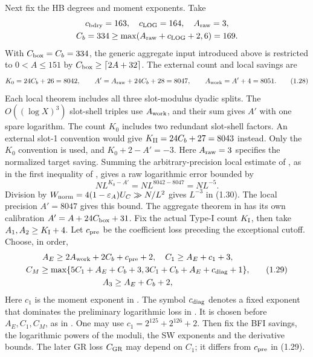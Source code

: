 Next fix the HB degrees and moment exponents.
Take
\[
 \begin{gathered}
 c_{\rm bdry}=163,\quad c_{\rm LOG}=164,\quad A_{\rm raw}=3,\\
 C_b=334\ge\max(A_{\rm raw}+c_{\rm LOG}+2,6)=169.
 \end{gathered}
\]
With $C_{\rm box}=C_b=334$, the generic aggregate input introduced above
is restricted to $0<A\le151$ by $C_{\rm box}\ge\lceil2A+32\rceil$.
The external count and local savings are
\begingroup\small
\[
 K_0=24C_b+26=8042,\qquad
 A'=A_{\rm raw}+24C_b+28=8047,\qquad
 A_{\rm work}=A'+4=8051.                                    \tag{1.28}
\]
\endgroup
Each local theorem includes all three slot-modulus dyadic splits.
The $O((\log X)^3)$ slot-shell triples use $A_{\rm work}$,
and their sum gives $A'$ with one spare logarithm.
The count $K_0$ includes two redundant slot-shell factors.
An external slot-1 convention would give
$K_{\rm II}=24C_b+27=8043$ instead.
Only the $K_0$ convention is used, and $K_0+2-A'=-3$.
Here $A_{\rm raw}=3$ specifies the normalized target saving.
Summing the arbitrary-precision local estimate of
\cite[Theorem~3.2, (3.13)]{Z1}, as in the first inequality of
\cite[(3.92)]{Z1}, gives a raw logarithmic error bounded by
\[
 N L^{K_0-A'}=N L^{8042-8047}=N L^{-5}.
\]
Division by $W_{\rm norm}=4(1-\varepsilon_A)U_C\gg N/L^2$
gives $L^{-3}$ in (1.30).
The local precision $A'=8047$ gives this bound.
The aggregate theorem in \cite{Z1} has its own calibration
$A'=A+24C_{\rm box}+31$.
Fix the actual Type-I count $K_{\rm I}$, then take $A_1,A_2\ge K_{\rm I}+4$.
Let $c_{\rm pre}$ be the coefficient loss preceding the exceptional cutoff.
Choose, in order,
\[
 \begin{gathered}
 A_E\ge2A_{\rm work}+2C_b+c_{\rm pre}+2,\quad C_1\ge A_E+c_1+3,\\
 C_M\ge\max\{5C_1+A_E+C_b+3,
                   3C_1+C_b+A_E+c_{\rm diag}+1\},\\
 A_3\ge A_E+C_b+2,
 \end{gathered}                                              \tag{1.29}
\]
Here $c_1$ is the moment exponent in \cite[(3.20)]{Z1}.
The symbol $c_{\rm diag}$ denotes a fixed exponent that dominates
the preliminary logarithmic loss in \cite[(3.41)]{Z1}.
It is chosen before $A_E,C_1,C_M$, as in \cite[\S3.10]{Z1}.
One may use $c_1=2^{125}+2^{126}+2$.
Then fix the BFI savings, the logarithmic powers of the moduli,
the SW exponents and the derivative bounds.
The later GR loss $C_{\rm GR}$ may depend on $C_1$;
it differs from $c_{\rm pre}$ in (1.29).

